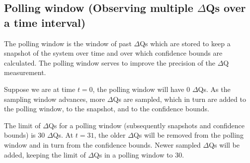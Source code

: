     \subsection{Polling window (Observing multiple $\Delta$Qs over a time interval)}
        The polling window is the window of past $\Delta$Qs which are stored to keep a snapshot of the system over time and over which confidence bounds are calculated. The polling window serves to improve the precision of the $\Delta$Q measurement.
        
        Suppose we are at time $t = 0$, the polling window will have 0 $\Delta$Qs. As the sampling window advances, more $\Delta$Qs are sampled, which in turn are added to the polling window, to the snapshot, and to the confidence bounds.

        The limit of $\Delta$Qs for a polling window (subsequently snapshots and confidence bounds) is 30 $\Delta$Qs. At $t = 31$, the older $\Delta$Qs will be removed from the polling window and in turn from the confidence bounds. Newer sampled $\Delta$Qs will be added, keeping the limit of $\Delta$Qs in a polling window to 30.

